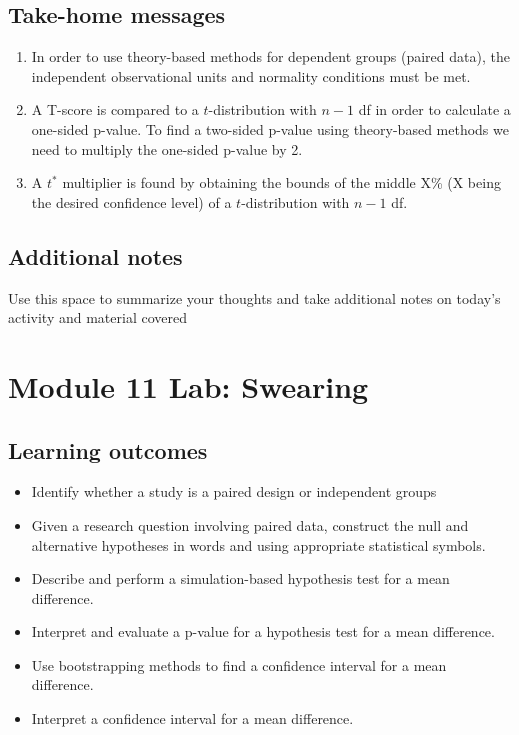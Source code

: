 \documentclass[
]{report}
\begin{document}
\subsection{Take-home messages}\label{take-home-messages-20}

\begin{enumerate}
\def\labelenumi{\arabic{enumi}.}
\item
  In order to use theory-based methods for dependent groups (paired data), the independent observational units and normality conditions must be met.
\item
  A T-score is compared to a \(t\)-distribution with \(n - 1\) df in order to calculate a one-sided p-value. To find a two-sided p-value using theory-based methods we need to multiply the one-sided p-value by 2.
\item
  A \(t^*\) multiplier is found by obtaining the bounds of the middle X\% (X being the desired confidence level) of a \(t\)-distribution with \(n - 1\) df.
\end{enumerate}

\subsection{Additional notes}\label{additional-notes-21}

Use this space to summarize your thoughts and take additional notes on today's activity and material covered

\newpage

\section{Module 11 Lab: Swearing}\label{module-11-lab-swearing}


\subsection{Learning outcomes}\label{learning-outcomes-26}

\begin{itemize}
\item
  Identify whether a study is a paired design or independent groups
\item
  Given a research question involving paired data, construct the null and alternative hypotheses
  in words and using appropriate statistical symbols.
\item
  Describe and perform a simulation-based hypothesis test for a mean difference.
\item
  Interpret and evaluate a p-value for a hypothesis test for a mean difference.
\item
  Use bootstrapping methods to find a confidence interval for a mean difference.
\item
  Interpret a confidence interval for a mean difference.
\end{itemize}
\end{document}

